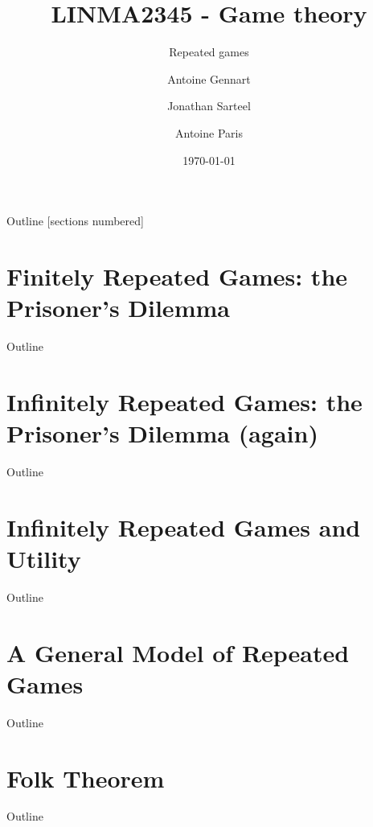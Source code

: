 \documentclass[10pt, notes]{beamer}
\title{LINMA2345 - Game theory}
\subtitle{Repeated games}
\date{\today}
\author{Antoine Gennart\and Jonathan Sarteel\and Antoine Paris}
\institute{Ecole polytechnique de Louvain}
\begin{document}
\maketitle


\begin{frame}{Outline}
    [sections numbered]
    \tableofcontents[hideallsubsections]
\end{frame}

\section{Finitely Repeated Games: the Prisoner's Dilemma}
\begin{frame}{Outline}
    \tableofcontents[currentsection]
\end{frame}



\section{Infinitely Repeated Games: the Prisoner's Dilemma (again)}
\begin{frame}{Outline}
    \tableofcontents[currentsection]
\end{frame}



\section{Infinitely Repeated Games and Utility}
\begin{frame}{Outline}
    \tableofcontents[currentsection]
\end{frame}



\section{A General Model of Repeated Games}
\begin{frame}{Outline}
    \tableofcontents[currentsection]
\end{frame}



\section{Folk Theorem}
\begin{frame}{Outline}
    \tableofcontents[currentsection]
\end{frame}
\end{document}

